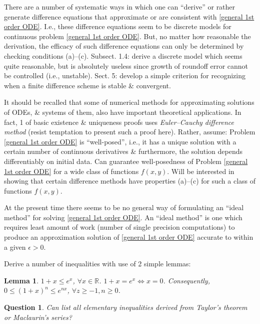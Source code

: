 \documentclass{article}
\newtheorem{lemma}{Lemma}
\newtheorem{question}{Question}
\begin{document}
\begin{enumerate}
\begin{itemize}
\begin{itemize}
			There are a number of systematic ways in which one can ``derive'' or rather generate difference equations that approximate or are consistent with \eqref{general 1st order ODE}. I.e., these difference equations seem to be discrete models for continuous problem \eqref{general 1st order ODE}. But, no matter how reasonable the derivation, the efficacy of such difference equations can only be determined by checking conditions (a)--(c). Subsect. 1.4: derive a discrete model which seems quite reasonable, but is absolutely useless since growth of roundoff error cannot be controlled (i.e., unstable). Sect. 5: develop a simple criterion for recognizing when a finite difference scheme is stable \& convergent.
			
			It should be recalled that some of numerical methods for approximating solutions of ODEs, \& systems of them, also have important theoretical applications. In fact, 1 of basic existence \& uniqueness proofs uses {\it Euler--Cauchy difference method} (resist temptation to present such a proof here). Rather, assume: Problem \eqref{general 1st order ODE} is ``well-posed'', i.e., it has a unique solution with a certain number of continuous derivatives \& furthermore, the solution depends differentiably on initial data. Can guarantee well-posedness of Problem \eqref{general 1st order ODE} for a wide class of functions $f(x,y)$. Will be interested in showing that certain difference methods have properties (a)--(c) for such a class of functions $f(x,y)$.
			
			At the present time there seems to be no general way of formulating an ``ideal method'' for solving \eqref{general 1st order ODE}. An ``ideal method'' is one which requires least amount of work (number of single precision computations) to produce an approximation solution of \eqref{general 1st order ODE} accurate to within a given $\epsilon > 0$.
			
			Derive a number of inequalities with use of 2 simple lemmas:
			\begin{lemma}
				$1 + x\le e^x$, $\forall x\in\mathbb{R}$. $1 + x = e^x\Leftrightarrow x = 0$. Consequently, $0\le(1 + x)^n\le e^{nx}$, $\forall z\ge-1,n\ge0$.
			\end{lemma}
			
			\begin{question}
				Can list all elementary inequalities derived from Taylor's theorem or Maclaurin's series?
			\end{question}
			

\end{itemize}
\end{itemize}
\end{enumerate}
\end{document}
